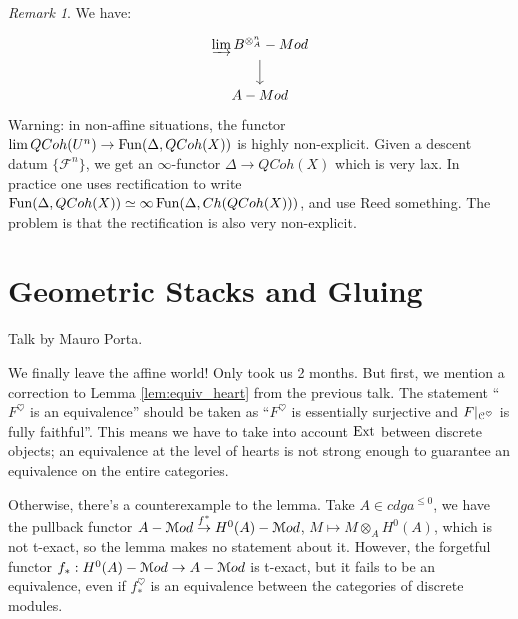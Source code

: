 \documentclass[10pt,a4paper,reqno,oneside]{book} %
\theoremstyle{plain}
\theoremstyle{definition}
\theoremstyle{remark}
\newtheorem{rem}[thm]{Remark}
\numberwithin{equation}{section}
\begin{document}
\begin{rem}
We have:
\[
\begin{tikzcd}
 \varinjlim B^{\otimes_A^{n}} - Mod \arrow{d} \\
A-Mod
\end{tikzcd}
\]
Warning: in non-affine situations, the functor $\lim QCoh(U^n) \to \operatorname{Fun}(\Delta, QCoh(X))$ is highly non-explicit. Given
a descent datum $\{\mathcal{F}^n\}$, we get an $\infty$-functor $\Delta \to QCoh(X)$ which is very lax. In practice one uses
rectification to write $\operatorname{Fun}(\Delta, QCoh(X)) \simeq \infty \operatorname{Fun}(\Delta, Ch(QCoh(X)))$, and use Reed something. The problem is
that the rectification is also very non-explicit.
\end{rem}





\chapter{Geometric Stacks and Gluing}
Talk by Mauro Porta.


We finally leave the affine world! Only took us 2 months. But first, we mention a
correction to Lemma \ref{lem:equiv_heart} from the previous talk.
The statement ``$F^{\heartsuit}$ is an equivalence'' should be taken as ``$F^{\heartsuit}$ is essentially surjective and 
$F|_{\mathcal C^{\heartsuit}}$ is
fully faithful''. This means we have to take into account $\operatorname{Ext}$ between discrete objects; an equivalence at the level of
hearts is not strong enough to guarantee an equivalence on the entire categories.

Otherwise, there's a counterexample to the lemma. Take $A \in cdga^{\leq 0}$, we have the pullback  functor 
$A-\mathcal M od \overset{f^*}{\to} H^0(A)-\mathcal M od$, $M\mapsto M \otimes_A H^0(A)$, which is not t-exact, so the lemma makes no statement
about it. However, the forgetful functor $f_* : H^0(A) - \mathcal M od \to A-\mathcal M od$ is t-exact, but it fails to be an equivalence, even if
$f_*^{\heartsuit}$ is an equivalence between the categories of discrete modules.
\end{document}
